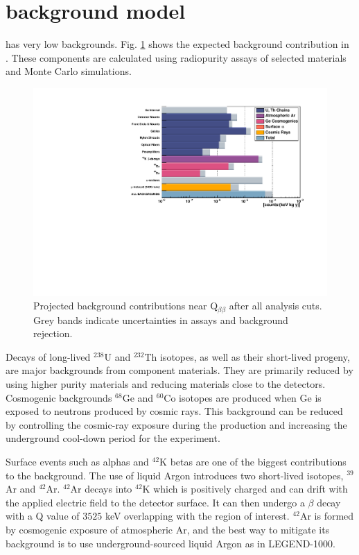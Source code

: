 

\section{{\Ltwo} background model}

{\Ltwo} has very low backgrounds. Fig. \ref{fig:L200_background} shows the expected background contribution in {\Ltwo}. These components are calculated using radiopurity assays of selected materials and Monte Carlo simulations. 

\begin{figure}[!htb]
\centering
  \includegraphics[width=0.8\linewidth]{ch2/figs/L200_background.pdf}
  \caption{{\Ltwo} Projected background contributions near Q$_{\beta\beta}$ after all analysis cuts. Grey bands indicate uncertainties in assays and background rejection.}
\label{fig:L200_background}
  \end{figure}


  
Decays of long-lived $^{238}$U and $^{232}$Th isotopes, as well as their short-lived progeny, are major backgrounds from component materials. They are primarily reduced by using higher purity materials and reducing materials close to the detectors. Cosmogenic backgrounds $^{68}$Ge and $^{60}$Co isotopes are produced when Ge is exposed to neutrons produced by cosmic rays. This background can be reduced by controlling the cosmic-ray exposure during the production and increasing the underground cool-down period for the experiment. 

Surface events such as alphas and $^{42}$K betas are one of the biggest contributions to the background. The use of liquid Argon introduces two short-lived isotopes, $^{39}$Ar and $^{42}$Ar.  $^{42}$Ar decays into $^{42}$K which is positively charged and can drift with the applied electric field to the detector surface. It can then undergo a $\beta$ decay with a Q value of $3525$ keV overlapping with the region of interest. $^{42}$Ar is formed by cosmogenic exposure of atmospheric Ar, and the best way to mitigate its background is to use underground-sourced liquid Argon as in LEGEND-1000.

